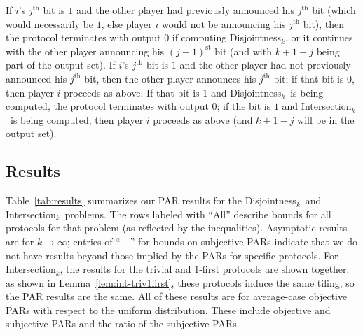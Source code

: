\documentclass{article}
\theoremstyle{theorem}
\theoremstyle{definition}
\theoremstyle{remark}
\newcommand{\disjoint}{{\sc Dis\-joint\-ness}\ensuremath{_k}}
\newcommand{\intersection}{{\sc In\-ter\-sec\-tion}\ensuremath{_k}}
\begin{document}
If $i$'s $j^\mathrm{th}$ bit is $1$ and the other player had previously announced his $j^\mathrm{th}$ bit (which would necessarily be $1$, else player $i$ would not be announcing his $j^\mathrm{th}$ bit), then the protocol terminates with output $0$ if computing \disjoint, or it continues with the other player announcing his $(j+1)^\mathrm{st}$ bit (and with $k+1-j$ being part of the output set).  If $i$'s $j^\mathrm{th}$ bit is $1$ and the other player had not previously announced his $j^\mathrm{th}$ bit, then the other player announces his $j^\mathrm{th}$ bit; if that bit is $0$, then player $i$ proceeds as above.  If that bit is $1$ and \disjoint\ is being computed, the protocol terminates with output $0$; if the bit is $1$ and \intersection\ is being computed, then player $i$ proceeds as above (and $k+1-j$ will be in the output set).

\subsection{Results}

Table~\ref{tab:results} summarizes our PAR results for the \disjoint\ and \intersection\ problems.  The rows labeled with ``All'' describe bounds for all protocols for that problem (as reflected by the inequalities).  Asymptotic results are for $k\rightarrow\infty$; entries of ``---'' for bounds on subjective PARs indicate that we do not have results beyond those implied by the PARs for specific protocols.
For \intersection, the results for the trivial and $1$-first protocols are shown together; as shown in Lemma~\ref{lem:int-triv1first}, these protocols induce the same tiling, so the PAR results are the same.  All of these results are for average-case objective PARs with respect to the uniform distribution.  These include objective and subjective PARs and the ratio of the subjective PARs.
\end{document}

